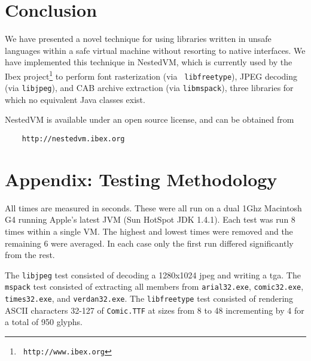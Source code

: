 \documentclass{acmconf}
\begin{document}
\section{Conclusion}

We have presented a novel technique for using libraries written in
unsafe languages within a safe virtual machine without resorting to
native interfaces.  We have implemented this technique in NestedVM,
which is currently used by the Ibex project\footnote{{\tt
http://www.ibex.org}} to perform font rasterization (via {\tt
libfreetype}), JPEG decoding (via {\tt libjpeg}), and CAB archive
extraction (via {\tt libmspack}), three libraries for which no
equivalent Java classes exist.

NestedVM is available under an open source license, and can be
obtained from
\begin{verbatim}
    http://nestedvm.ibex.org
\end{verbatim}


\section{Appendix: Testing Methodology}

All times are measured in seconds. These were all run on a dual 1Ghz
Macintosh G4 running Apple's latest JVM (Sun HotSpot JDK 1.4.1). Each
test was run 8 times within a single VM. The highest and lowest times
were removed and the remaining 6 were averaged.  In each case only the
first run differed significantly from the rest.

The {\tt libjpeg} test consisted of decoding a 1280x1024 jpeg and
writing a tga.  The {\tt mspack} test consisted of extracting all
members from {\tt arial32.exe}, {\tt comic32.exe}, {\tt times32.exe},
and {\tt verdan32.exe}. The {\tt libfreetype} test consisted of
rendering ASCII characters 32-127 of {\tt Comic.TTF} at sizes from 8
to 48 incrementing by 4 for a total of 950 glyphs.


\end{document}
